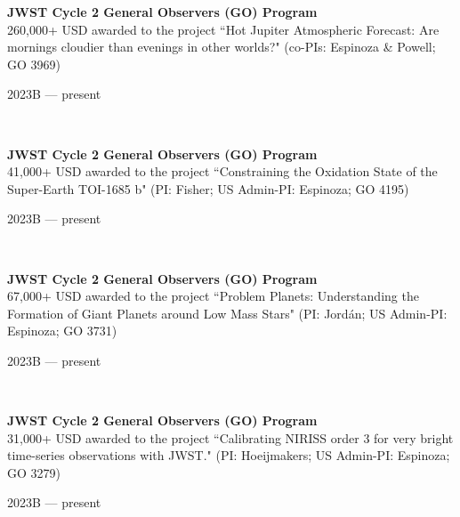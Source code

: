 \documentclass[12pt, a4paper]{article} %
\begin{document}
\begin{minipage}[t]{0.7\textwidth}
\begin{flushleft}%
  \setlength{\leftskip}{0.2cm}%
\textbf{JWST Cycle 2 General Observers (GO) Program}\\
260,000+ USD awarded to the project ``Hot Jupiter Atmospheric Forecast: Are mornings cloudier than evenings in other worlds?" (co-PIs: Espinoza \& Powell; GO 3969)
\end{flushleft}
\end{minipage}
\begin{minipage}[t]{0.3\textwidth}
\hfill 2023B --- present
\end{minipage}\\

\begin{minipage}[t]{0.7\textwidth}
\begin{flushleft}%
  \setlength{\leftskip}{0.2cm}%
\textbf{JWST Cycle 2 General Observers (GO) Program}\\
41,000+ USD awarded to the project ``Constraining the Oxidation State of the Super-Earth TOI-1685 b" (PI: Fisher; US Admin-PI: Espinoza; GO 4195)
\end{flushleft}
\end{minipage}
\begin{minipage}[t]{0.3\textwidth}
\hfill 2023B --- present
\end{minipage}\\

\begin{minipage}[t]{0.7\textwidth}
\begin{flushleft}%
  \setlength{\leftskip}{0.2cm}%
\textbf{JWST Cycle 2 General Observers (GO) Program}\\
67,000+ USD awarded to the project ``Problem Planets: Understanding the Formation of Giant Planets around Low Mass Stars" (PI: Jord\'an; US Admin-PI: Espinoza; GO 3731)
\end{flushleft}
\end{minipage}
\begin{minipage}[t]{0.3\textwidth}
\hfill 2023B --- present
\end{minipage}\\

\begin{minipage}[t]{0.7\textwidth}
\begin{flushleft}%
  \setlength{\leftskip}{0.2cm}%
\textbf{JWST Cycle 2 General Observers (GO) Program}\\
31,000+ USD awarded to the project ``Calibrating NIRISS order 3 for very bright time-series observations with JWST." (PI: Hoeijmakers; US Admin-PI: Espinoza; GO 3279)
\end{flushleft}
\end{minipage}
\begin{minipage}[t]{0.3\textwidth}
\hfill 2023B --- present
\end{minipage}\\
\end{document}
